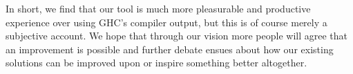 In short, we find that our tool is much more pleasurable and productive experience over using GHC's compiler output, but this is of
course merely a subjective account. We hope that through our vision more people will agree that an improvement is possible and 
further debate ensues about how our existing solutions can be improved upon or inspire something better altogether.


